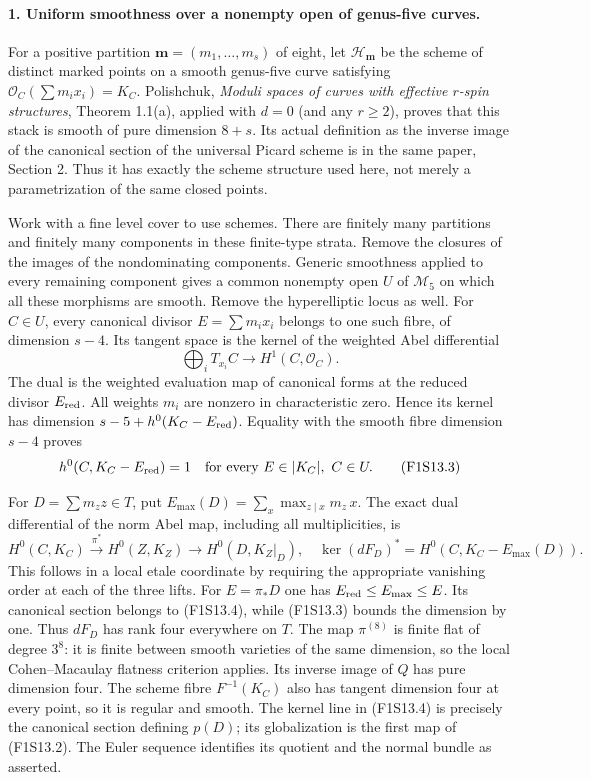 \paragraph{1. Uniform smoothness over a nonempty open of genus-five curves.}
For a positive partition $\mathbf m=(m_1,\ldots,m_s)$ of eight, let
$\mathcal H_{\mathbf m}$ be the scheme of distinct marked points on a
smooth genus-five curve satisfying
$\mathcal O_C(\sum m_ix_i)=K_C$.
Polishchuk, \emph{Moduli spaces of curves with effective $r$-spin
structures}, Theorem 1.1(a), applied with $d=0$ (and any $r\geq2$),
proves that this stack is smooth of pure dimension $8+s$.
Its actual definition as the inverse image of the canonical section of
the universal Picard scheme is in the same paper, Section 2. Thus it
has exactly the scheme structure used here, not merely a parametrization
of the same closed points.

Work with a fine level cover to use schemes. There are finitely many
partitions and finitely many components in these finite-type strata.
Remove the closures of the images of the nondominating components.
Generic smoothness applied to every remaining component gives a common
nonempty open $U$ of $\mathcal M_5$ on which all these morphisms are
smooth. Remove the hyperelliptic locus as well.
For $C\in U$, every canonical divisor $E=\sum m_ix_i$ belongs to one
such fibre, of dimension $s-4$. Its tangent space is the kernel of the
weighted Abel differential
\[
 \bigoplus_i T_{x_i}C\longrightarrow H^1(C,\mathcal O_C).
\]
The dual is the weighted evaluation map of canonical forms at the
reduced divisor $E_{\rm red}$. All weights $m_i$ are nonzero in
characteristic zero. Hence its kernel has dimension
$s-5+h^0(K_C-E_{\rm red})$. Equality with the smooth fibre dimension
$s-4$ proves
\[
            h^0(C,K_C-E_{\rm red})=1
       \quad\text{for every }E\in|K_C|,\ C\in U.
 \tag{F1S13.3}
\]

For $D=\sum m_zz\in T$, put
$E_{\max}(D)=\sum_x\max_{z\mid x}m_z\,x$. The exact dual differential
of the norm Abel map, including all multiplicities, is
\[
 H^0(C,K_C)\xrightarrow{\pi^*}H^0(Z,K_Z)
                    \longrightarrow H^0(D,K_Z|_D),
 \quad\ker(dF_D)^*=H^0(C,K_C-E_{\max}(D)).
 \tag{F1S13.4}
\]
This follows in a local etale coordinate by requiring the appropriate
vanishing order at each of the three lifts. For $E=\pi_*D$ one has
$E_{\rm red}\leq E_{\max}\leq E$. Its canonical section belongs to
(F1S13.4), while (F1S13.3) bounds the dimension by one. Thus $dF_D$ has
rank four everywhere on $T$.
The map $\pi^{(8)}$ is finite flat of degree $3^8$: it is finite between
smooth varieties of the same dimension, so the local Cohen--Macaulay
flatness criterion applies. Its inverse image of $Q$ has pure dimension
four. The scheme fibre $F^{-1}(K_C)$ also has tangent dimension four at
every point, so it is regular and smooth. The kernel line in (F1S13.4)
is precisely the canonical section defining $p(D)$; its globalization
is the first map of (F1S13.2). The Euler sequence identifies its quotient
and the normal bundle as asserted.

